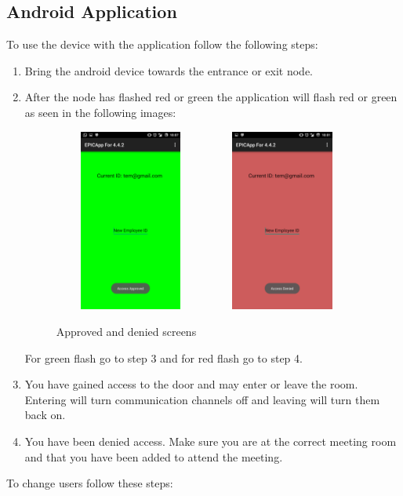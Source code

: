 \documentclass{article}
\begin{document}
\subsection{Android Application}
To use the device with the application follow the following steps:
\begin{enumerate}
\item Bring the android device towards the entrance or exit node.
\item {After the node has flashed red or green the application will flash red or green as seen in the following images:
\begin{figure}[H]
\center
\includegraphics[width=5cm, height=6cm]{Approved}
\includegraphics[width=5cm, height=6cm]{Denied}
\caption{Approved and denied screens}
\label{fig:my_label3}
\end{figure}}
For green flash go to step 3 and for red flash go to step 4.
\item{You have gained access to the door and may enter or leave the room. Entering will turn communication channels off and leaving will turn them back on.}
\item{You have been denied access. Make sure you are at the correct meeting room and that you have been added to attend the meeting.}
\end{enumerate}
To change users follow these steps:
\end{document}
